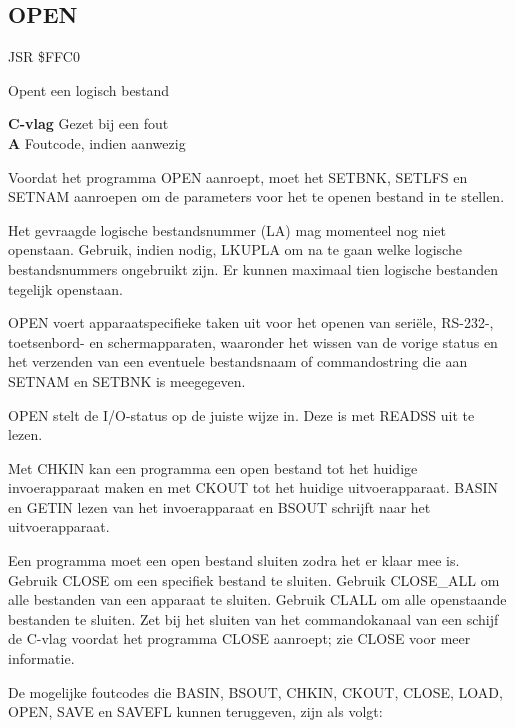 \subsection{OPEN}
\label{KERNAL Jump Table!OPEN}
\begin{description}[leftmargin=2cm,style=nextline]
    \item [Adres:] JSR \$FFC0    \item [Omschrijving:] Opent een logisch bestand    \item [Uitvoer:]        \textbf{C-vlag} Gezet bij een fout \\        \textbf{A} Foutcode, indien aanwezig    \item [Opmerkingen:]        Voordat het programma OPEN aanroept, moet het SETBNK, SETLFS en SETNAM aanroepen om de parameters voor het te openen bestand in te stellen.

        Het gevraagde logische bestandsnummer (LA) mag momenteel nog niet openstaan. Gebruik, indien nodig, LKUPLA om na te gaan welke logische bestandsnummers ongebruikt zijn. Er kunnen maximaal tien logische bestanden tegelijk openstaan.

        OPEN voert apparaatspecifieke taken uit voor het openen van seriële, RS-232-, toetsenbord- en schermapparaten, waaronder het wissen van de vorige status en het verzenden van een eventuele bestandsnaam of commandostring die aan SETNAM en SETBNK is meegegeven.

        OPEN stelt de I/O-status op de juiste wijze in. Deze is met READSS uit te lezen.

        Met CHKIN kan een programma een open bestand tot het huidige invoerapparaat maken en met CKOUT tot het huidige uitvoerapparaat. BASIN en GETIN lezen van het invoerapparaat en BSOUT schrijft naar het uitvoerapparaat.

        Een programma moet een open bestand sluiten zodra het er klaar mee is. Gebruik CLOSE om een specifiek bestand te sluiten. Gebruik CLOSE\_ALL om alle bestanden van een apparaat te sluiten. Gebruik CLALL om alle openstaande bestanden te sluiten. Zet bij het sluiten van het commandokanaal van een schijf de C-vlag voordat het programma CLOSE aanroept; zie CLOSE voor meer informatie.

        De mogelijke foutcodes die BASIN, BSOUT, CHKIN, CKOUT, CLOSE, LOAD, OPEN, SAVE en SAVEFL kunnen teruggeven, zijn als volgt:


\end{description}
